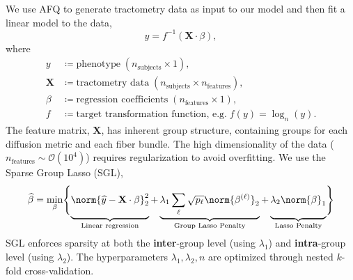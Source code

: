 \documentclass[a0paper,portrait,fontscale=0.395]{baposter}
\begin{document}
\begin{poster}
{\begingroup
\setlength\abovedisplayskip{0.5em}
We use AFQ to generate tractometry data as input to our model and then fit a linear model to the data,
\begin{equation*}
    y = f^{-1} \left( \mathbf{X} \cdot \beta \right),
\end{equation*}
where
\vspace{1em}
\begin{align*}
    y &\coloneqq \text{phenotype} \; (n_\text{subjects} \times 1), \\
    \mathbf{X} &\coloneqq \text{tractometry data} \; (n_\text{subjects} \times n_\text{features}), \\
    \beta &\coloneqq \text{regression coefficients} \; (n_\text{features} \times 1), \\
    f &\coloneqq \text{target transformation function, e.g.} \; f(y) = \log_n(y).
\end{align*}
The feature matrix, $\mathbf{X}$, has inherent group structure, containing groups for each diffusion metric and each fiber bundle.
The high dimensionality of the data ($n_\text{features} \sim \mathcal{O}(10^4)$) requires regularization to avoid overfitting. We use the Sparse Group Lasso (SGL),
\vspace{-0.5em}
\begin{equation*}
    \widehat{\beta} = \min_\beta \Biggl\{ 
        \underbrace{
            \vphantom{\lambda_1 \displaystyle \sum_\ell \sqrt{p_\ell} \norm{\beta^{(\ell)}}_2}
            \norm{\widehat{y} - \mathbf{X} \cdot \beta}_2^2
        }_{\text{Linear regression}}
        + \underbrace{
            \lambda_1 \displaystyle \sum_\ell \sqrt{p_\ell} \norm{\beta^{(\ell)}}_2
        }_{\text{Group Lasso Penalty}}
        + \underbrace{
            \vphantom{\lambda_1 \displaystyle \sum_\ell \sqrt{p_\ell} \norm{\beta^{(\ell)}}_2}
            \lambda_2 \norm{\beta}_1
        }_{\text{Lasso Penalty}}
    \Biggl\}
\end{equation*}
SGL enforces sparsity at both the \textbf{inter}-group level (using $\lambda_1$) and \textbf{intra}-group level (using $\lambda_2$). The hyperparameters $\lambda_1, \lambda_2, n$ are optimized through nested $k$-fold cross-validation.
\endgroup
}


\end{poster}
\end{document}
